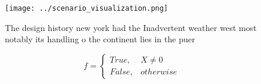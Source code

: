 \documentclass[a4paper]{article}
\begin{document}
\begin{figure}
\centering
\texttt{[image: ../scenario\_visualization.png]}
\caption{The design history new york had the Inadvertent weather west most notably its handling o the continent lies in the puer
}
\end{figure}
 
\begin{equation}   f =
\begin{cases} True, & X \neq 0\\
False, & otherwise
\end{cases}
\end{equation}
\end{document}
